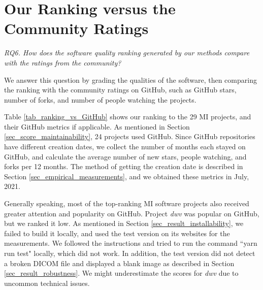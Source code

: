\section{Our Ranking versus the Community Ratings}
\label{sec_rq6_comparison}
\textit{RQ6. How does the software quality ranking generated by our methods compare with the ratings from the community?}

We answer this question by grading the qualities of the software, then comparing the ranking with the community ratings on GitHub, such as GitHub stars, number of forks, and number of people watching the projects.

Table \ref{tab_ranking_vs_GitHub} shows our ranking to the 29 MI projects, and their GitHub metrics if applicable. As mentioned in Section \ref{sec_score_maintainability}, 24 projects used GitHub. Since GitHub repositories have different creation dates, we collect the number of months each stayed on GitHub, and calculate the average number of new stars, people watching, and forks per 12 months. The method of getting the creation date is described in Section \ref{sec_empirical_measurements}, and we obtained these metrics in July, 2021.

Generally speaking, most of the top-ranking MI software projects also received greater attention and popularity on GitHub. Project \textit{dwv} was popular on GitHub, but we ranked it low. As mentioned in Section \ref{sec_result_installability}, we failed to build it locally, and used the test version on its websites for the measurements. We followed the instructions and tried to run the command ``yarn run test" locally, which did not work. In addition, the test version did not detect a broken DICOM file and displayed a blank image as described in Section \ref{sec_result_robustness}. We might underestimate the scores for \textit{dwv} due to uncommon technical issues.

